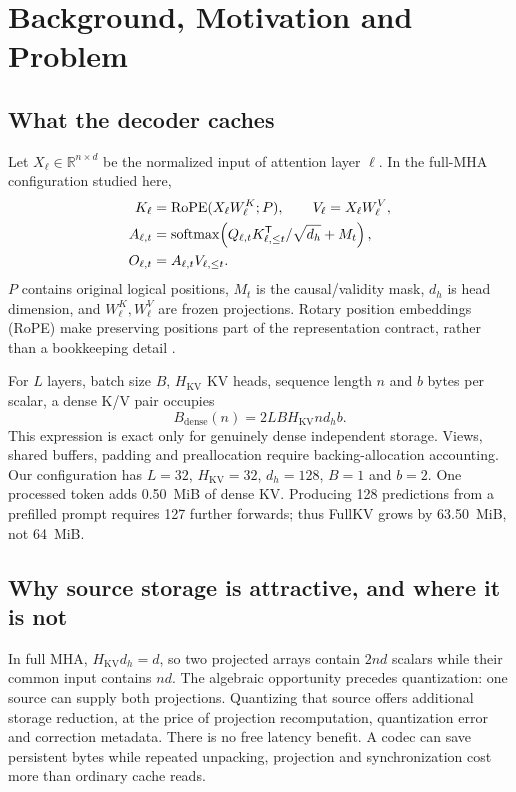 \section{Background, Motivation and Problem}
\label{sec:motivation}
\subsection{What the decoder caches}
Let $X_\ell\in\mathbb{R}^{n\times d}$ be the normalized input of attention
layer $\ell$. In the full-MHA configuration studied here,
\begin{align}
 K_\ell &= \operatorname{RoPE}(X_\ell W^K_\ell;P),\qquad
 V_\ell = X_\ell W^V_\ell, \label{eq:projections}\\
 A_{\ell,t} &= \operatorname{softmax}\!\left(
 Q_{\ell,t}K_{\ell,\leq t}^{\mathsf T}/\sqrt{d_h}+M_t\right),\nonumber\\
 O_{\ell,t} &= A_{\ell,t} V_{\ell,\leq t}. \label{eq:attention}
\end{align}
$P$ contains original logical positions, $M_t$ is the causal/validity mask,
$d_h$ is head dimension, and $W^K_\ell,W^V_\ell$ are frozen projections.
Rotary position embeddings (RoPE) make preserving positions part of the
representation contract, rather than a bookkeeping detail
\citep{su2021rope}.

For $L$ layers, batch size $B$, $H_{\mathrm{KV}}$ KV heads, sequence length
$n$ and $b$ bytes per scalar, a dense K/V pair occupies
\begin{equation}
 B_{\mathrm{dense}}(n)=2LBH_{\mathrm{KV}}nd_hb.
 \label{eq:densebytes}
\end{equation}
This expression is exact only for genuinely dense independent storage.
Views, shared buffers, padding and preallocation require backing-allocation
accounting. Our configuration has $L=32$, $H_{\mathrm{KV}}=32$, $d_h=128$,
$B=1$ and $b=2$. One processed token adds 0.50~MiB of dense KV. Producing
128 predictions from a prefilled prompt requires 127 further forwards;
thus FullKV grows by 63.50~MiB, not 64~MiB.

\subsection{Why source storage is attractive, and where it is not}
In full MHA, $H_{\mathrm{KV}}d_h=d$, so two projected arrays contain
$2nd$ scalars while their common input contains $nd$. The algebraic
opportunity precedes quantization: one source can supply both projections.
Quantizing that source offers additional storage reduction, at the price of
projection recomputation, quantization error and correction metadata.
There is no free latency benefit. A codec can save persistent bytes while
repeated unpacking, projection and synchronization cost more than ordinary
cache reads.

